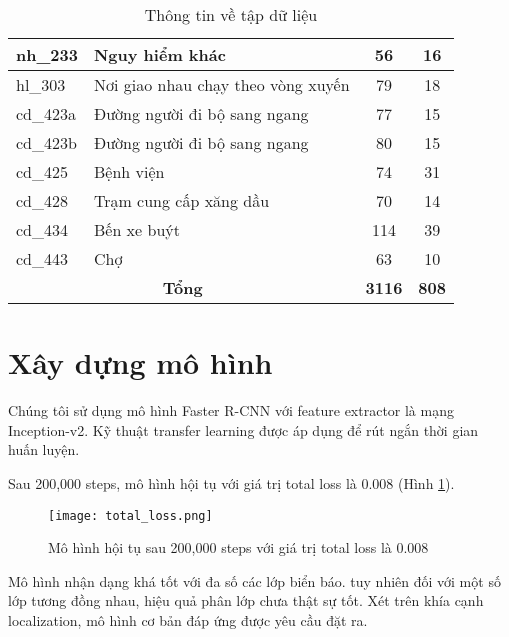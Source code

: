 \documentclass[../thesis.tex]{subfiles}
\begin{document}
\begin{table}[H]
\begin{longtable}{| l | l | c | c |}
	nh\_233 & Nguy hiểm khác & 56 & 16\\
	\hline
	hl\_303 & Nơi giao nhau chạy theo vòng xuyến & 79 & 18\\
	\hline
	cd\_423a & Đường người đi bộ sang ngang & 77 & 15\\
	\hline
	cd\_423b & Đường người đi bộ sang ngang & 80 & 15\\
	\hline
	cd\_425 & Bệnh viện & 74 & 31\\
	\hline
	cd\_428 & Trạm cung cấp xăng dầu & 70 & 14\\
	\hline
	cd\_434 & Bến xe buýt & 114 & 39\\
	\hline
	cd\_443 & Chợ & 63 & 10\\
	\hline
	\multicolumn{2}{|c|}{\textbf{Tổng}} & \textbf{3116} & \textbf{808}\\
	\hline
\end{longtable}
\caption{Thông tin về tập dữ liệu}
\label{Table:datset}
\end{table}

\section{Xây dựng mô hình}

Chúng tôi sử dụng mô hình Faster R-CNN với feature extractor là mạng Inception-v2. Kỹ thuật transfer learning được áp dụng để rút ngắn thời gian huấn luyện. 

Sau 200,000 steps, mô hình hội tụ với giá trị total loss là 0.008 (Hình \ref{Fig:total_loss.png}).


\begin{figure}[H]
	\centering
	\texttt{[image: total\_loss.png]}
	\caption{Mô hình hội tụ sau 200,000 steps với giá trị total loss là 0.008}\label{Fig:total_loss.png}
\end{figure}


Mô hình nhận dạng khá tốt với đa số các lớp biển báo. tuy nhiên đối với một số lớp tương đồng nhau, hiệu quả phân lớp chưa thật sự tốt. Xét trên khía cạnh localization, mô hình cơ bản đáp ứng được yêu cầu đặt ra.
\end{document}

